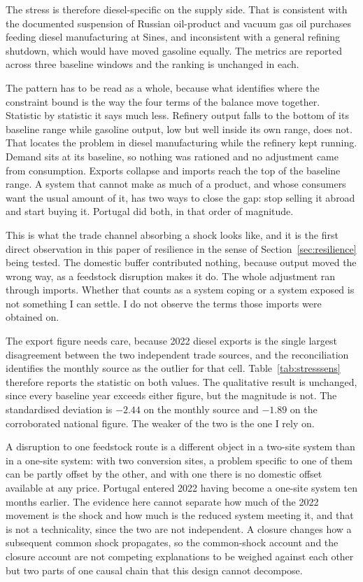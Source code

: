 \documentclass[11pt,a4paper]{article}
\begin{document}
The stress is therefore diesel-specific on the supply side. That is consistent with the
documented suspension of Russian oil-product and vacuum gas oil purchases feeding diesel
manufacturing at Sines, and inconsistent with a general refining shutdown, which would have
moved gasoline equally. The metrics are reported across three baseline windows and the ranking
is unchanged in each.

The pattern has to be read as a whole, because what identifies where the constraint bound is the way the four terms of the balance move together. Statistic by statistic it says much less. Refinery
output falls to the bottom of its baseline range while gasoline output, low but well inside its
own range, does not. That locates the problem in diesel manufacturing while the refinery kept
running. Demand sits at its baseline, so nothing was rationed and no adjustment came from
consumption. Exports collapse and imports reach the top of the baseline range. A system that
cannot make as much of a product, and whose consumers want the usual amount of it, has two ways
to close the gap: stop selling it abroad and start buying it. Portugal did both, in that order
of magnitude.

This is what the trade channel absorbing a shock looks like, and it is the first direct
observation in this paper of resilience in the sense of Section~\ref{sec:resilience} being
tested. The domestic buffer contributed nothing, because output moved the wrong way, as a
feedstock disruption makes it do. The whole adjustment ran through imports. Whether that counts
as a system coping or a system exposed is not something I can settle. I do not observe the terms
those imports were obtained on.

The export figure needs care, because 2022 diesel exports is the single largest disagreement
between the two independent trade sources, and the reconciliation identifies the monthly source
as the outlier for that cell. Table~\ref{tab:stresssens} therefore reports the statistic on both
values. The qualitative result is unchanged, since every baseline year exceeds either figure,
but the magnitude is not. The standardised deviation is $-2.44$ on the monthly source and
$-1.89$ on the corroborated national figure. The weaker of the two is the one I rely on.

A disruption to one feedstock route is a different object in a two-site system than in a one-site
system: with two conversion sites, a problem specific to one of them can be partly offset
by the other, and with one there is no domestic offset available at any price. Portugal entered
2022 having become a one-site system ten months earlier. The evidence here cannot separate how
much of the 2022 movement is the shock and how much is the reduced system meeting it, and that
is not a technicality, since the two are not independent. A closure changes how a subsequent
common shock propagates, so the common-shock account and the closure account are not competing
explanations to be weighed against each other but two parts of one causal chain that this design
cannot decompose.
\end{document}
